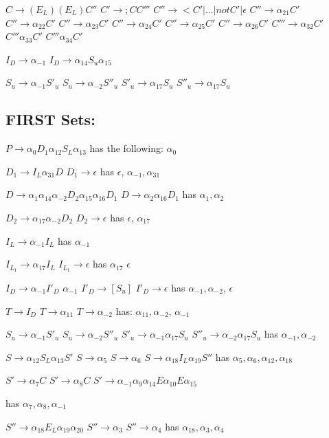 \documentclass[11pt]{article}
\begin{document}
$C \to (E_L )(E_L) C'' $
$C' \to ; C C'''$
$C'' \to < C' | ...  | not C' | \epsilon$
$C'' \to \alpha _{21} C'$
$C'' \to \alpha _{22} C'$
$C'' \to \alpha _{23} C'$
$C'' \to \alpha _{24} C'$
$C'' \to  \alpha _{25} C'$
$C'' \to \alpha _{26} C'$
$C''' \to \alpha_{32} C' $
$C''' \alpha_{33} C' $
$C'''  \alpha_{34} C'$

$I_D	 \to  	\alpha_{-1} $
$ I_D \to \alpha_{14} S_u \alpha_{15} $

$S_u \to	\alpha_{-1} S'_u $
$S_u \to \alpha_{-2} S''_u$
$S'_u \to \alpha_{17} S_u $
$S''_u \to \alpha_{17} S_u $


\subsection {FIRST Sets:}
$P\to \alpha_0 D_1 \alpha_{12} S_L \alpha_{13}$ has the following:
$\alpha_0$

$D_1 \to I_L \alpha_{31} D $ $D_1 \to \epsilon $ 
has 
$\epsilon$, $\alpha_{-1}, \alpha_{31}$


$D \to \alpha _1 \alpha_{14} \alpha_{-2} D_2 \alpha_{15} \alpha_{16} D_1 $
$D \to \alpha_2 \alpha_{16} D_1$
has
$\alpha_{1}, \alpha_{2}$

$D_2 \to \alpha_{17} \alpha_{-2} D_2$
$D_2 \to \epsilon $
has
$\epsilon$, $\alpha_{17}$



$I_L \to \alpha _{-1} I_L $ has
$\alpha_{-1} $


$I_{L_1} \to \alpha _{17} I_L  $
$I_{L_1} \to \epsilon $
has
$\alpha_{17}$ $\epsilon$

$I_D	 \to  	\alpha_{-1} I'_D $
$\alpha_{-1}$
$ I'_D \to [ S_u ]  $
$ I'_D \to \epsilon $
has 
$\alpha_{-1}, \alpha_{-2}$, $\epsilon$

$T\to I_D $
$T\to \alpha_{11} $
$T\to \alpha_{-2} $
has:  
$\alpha_{11},\alpha_{-2}$, $\alpha_{-1}$

$S_u \to	\alpha_{-1} S'_u$
$S_u \to \alpha_{-2} S''_u$
$S'_u \to \alpha_{-1} \alpha_{17} S_u $
$S''_u \to \alpha_{-2} \alpha_{17} S_u $
has
$\alpha_{-1}, \alpha_{-2}$


$S \to \alpha_{12} S_L \alpha_{13} S' $
$S \to \alpha_5 $
$S \to \alpha_6 $
$S \to \alpha_{18} I_L \alpha_{19} S''$
has
$\alpha_{5}, \alpha_{6}, \alpha_{12}, \alpha_{18}$

$S' \to \alpha_7 C$
$S' \to \alpha_8 C$
$S' \to \alpha_{-1} \alpha_{9} \alpha_{14} E \alpha_{10} E \alpha_{15}$

has 
$\alpha_{7}, \alpha_{8}, \alpha_{-1}$


$S'' \to \alpha_{18} E_L \alpha_{19} \alpha_{20} $
$S'' \to \alpha_{3}$
$S'' \to \alpha_{4} $
has 
$\alpha_{18}, \alpha_{3}, \alpha_{4}$
\end{document}
